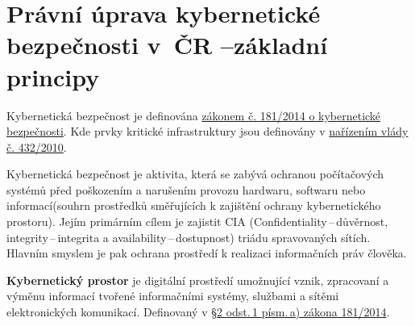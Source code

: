 \clearpage
\section[Právní úprava kybernetické bezpečnosti v ČR -- základní principy]{Právní úprava kybernetické bezpečnosti v~ČR --\newline základní principy}

Kybernetická bezpečnost je definována \href{https://www.zakonyprolidi.cz/cs/2014-181}{zákonem č. 181/2014 o kybernetické bezpečnosti}. Kde prvky kritické infrastruktury jsou definovány v \href{https://www.zakonyprolidi.cz/cs/2010-432}{nařízením vlády č. 432/2010}.

Kybernetická bezpečnost je aktivita, která se zabývá ochranou počítačových systémů před poškozením a narušením provozu hardwaru, softwaru nebo informací(souhrn prostředků směřujících k zajištění ochrany kybernetického prostoru). Jejím primárním cílem je zajistit CIA (Confidentiality\,--\,důvěrnost, integrity\,--\,integrita a availability\,--\,dostupnost) triádu spravovaných sítích. Hlavním smyslem je pak ochrana prostředí k realizaci informačních práv člověka.

\textbf{Kybernetický prostor} je digitální prostředí umožnující vznik, zpracovaní a výměnu informací tvořené informačními systémy, službami a sítěmi elektronických komunikací. Definovaný v  \href{https://www.zakonyprolidi.cz/cs/2014-181#p2-1-a}{§2 odst.\,1 písm.\,a) zákona 181/2014}.

